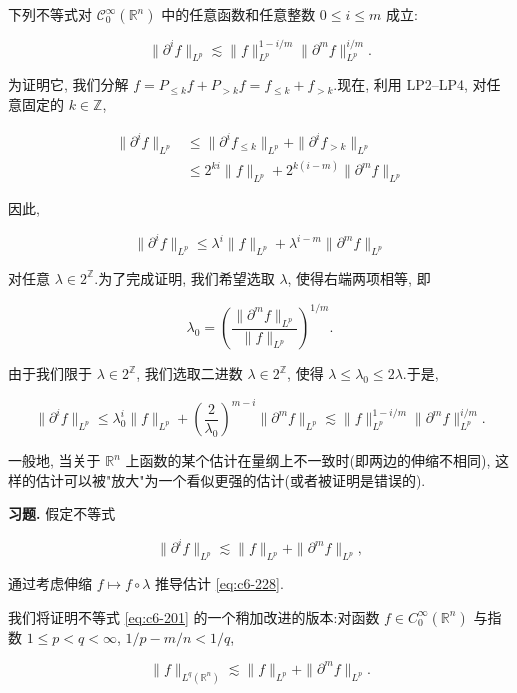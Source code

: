 
下列不等式对 $\mathcal{C}_0^\infty(\mathbb{R}^n)$ 中的任意函数和任意整数 $0 \leq i \leq m$ 成立:

\begin{equation}
\|\partial^i f\|_{L^p} \lesssim \|f\|_{L^p}^{1-i/m} \|\partial^m f\|_{L^p}^{i/m}.\label{eq:c6-228}
\end{equation}

为证明它, 我们分解 $f = P_{\leq k} f + P_{> k} f = f_{\leq k} + f_{> k}$.现在, 利用 LP2--LP4, 对任意固定的 $k \in \mathbb{Z}$,

\[
\begin{aligned}
\|\partial^i f\|_{L^p} &\leq \|\partial^i f_{\leq k}\|_{L^p} + \|\partial^i f_{> k}\|_{L^p}\\
&\leq 2^{ki} \|f\|_{L^p} + 2^{k(i-m)} \|\partial^m f\|_{L^p}
\end{aligned}
\]

因此,

\[
\|\partial^i f\|_{L^p} \leq \lambda^i \|f\|_{L^p} + \lambda^{i-m} \|\partial^m f\|_{L^p}
\]

对任意 $\lambda \in 2^{\mathbb{Z}}$.为了完成证明, 我们希望选取 $\lambda$, 使得右端两项相等, 即

\[
\lambda_0 = \left(\frac{\|\partial^m f\|_{L^p}}{\|f\|_{L^p}}\right)^{1/m}.
\]

由于我们限于 $\lambda \in 2^{\mathbb{Z}}$, 我们选取二进数 $\lambda \in 2^{\mathbb{Z}}$, 使得 $\lambda \leq \lambda_0 \leq 2\lambda$.于是,

\[
\|\partial^i f\|_{L^p} \leq \lambda_0^i \|f\|_{L^p} + \left(\frac{2}{\lambda_0}\right)^{m-i} \|\partial^m f\|_{L^p} \lesssim \|f\|_{L^p}^{1-i/m} \|\partial^m f\|_{L^p}^{i/m}.
\]

一般地, 当关于 $\mathbb{R}^n$ 上函数的某个估计在量纲上不一致时(即两边的伸缩不相同), 这样的估计可以被"放大"为一个看似更强的估计(或者被证明是错误的).

\textbf{习题.} 假定不等式

\[
\|\partial^i f\|_{L^p} \lesssim \|f\|_{L^p} + \|\partial^m f\|_{L^p},
\]

通过考虑伸缩 $f \mapsto f \circ \lambda$ 推导估计 \eqref{eq:c6-228}.


我们将证明不等式 \eqref{eq:c6-201} 的一个稍加改进的版本:对函数 $f \in C_0^\infty(\mathbb{R}^n)$ 与指数 $1 \leq p < q < \infty$, $1/p - m/n < 1/q$,

\[
\|f\|_{L^q(\mathbb{R}^n)} \lesssim \|f\|_{L^p} + \|\partial^m f\|_{L^p}.
\]

